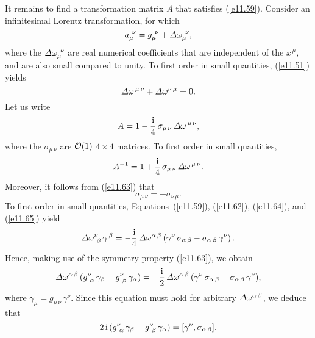 It remains to find a transformation matrix $A$ that satisfies (\ref{e11.59}). Consider an infinitesimal Lorentz transformation, for which
\begin{equation}\label{e11.62}
a_\mu^{~\nu} = g_\mu^{~\nu} + {\mit\Delta}\omega_\mu^{~\nu},
\end{equation}
where the ${\mit\Delta}\omega_\mu^{~\nu}$ are real numerical coefficients that are independent of the $x^{\,\mu}$, and are  also small compared to unity. To first order in small quantities, (\ref{e11.51}) yields
\begin{equation}\label{e11.63}
{\mit\Delta}\omega^{\,\mu\,\nu} + {\mit\Delta}\omega^{\nu\,\mu} = 0.
\end{equation}
Let us write
\begin{equation}\label{e11.64}
A = 1 - \frac{{\rm i}}{4}\,\sigma_{\mu\,\nu}\,{\mit\Delta}\omega^{\,\mu\,\nu},
\end{equation}
where the $\sigma_{\mu\,\nu}$ are ${\cal O}(1)$ $4\times 4$ matrices. To first order in small
quantities,
\begin{equation}\label{e11.65}
A^{-1} = 1 + \frac{{\rm i}}{4}\,\sigma_{\mu\,\nu}\,{\mit\Delta}\omega^{\,\mu\,\nu}.
\end{equation}
Moreover, it follows from (\ref{e11.63}) that
\begin{equation}
\sigma_{\mu\,\nu} = -\sigma_{\nu\,\mu}.
\end{equation}
To first order in small quantities, Equations~(\ref{e11.59}), (\ref{e11.62}), (\ref{e11.64}), and (\ref{e11.65}) yield
\begin{equation}
{\mit\Delta}\omega^\nu_{~\beta}\,\gamma^{\,\beta} = -\frac{\rm i}{4}\,{\mit\Delta}\omega^{\alpha\,\beta}\left(\gamma^\nu\,\sigma_{\alpha\,\beta}- \sigma_{\alpha\,\beta}\,\gamma^\nu\right).
\end{equation}
Hence, making use of the symmetry property (\ref{e11.63}), we obtain
\begin{equation}
{\mit\Delta}\omega^{\alpha\,\beta}\,(g^\nu_{~\alpha}\,\gamma_\beta -g^\nu_{~\beta}\,\gamma_\alpha) = -\frac{\rm i}{2}\,{\mit\Delta}\omega^{\alpha\,\beta}\,(\gamma^\nu\,\sigma_{\alpha\,\beta}-\sigma_{\alpha\,\beta}\,\gamma^\nu),
\end{equation}
where $\gamma_\mu = g_{\mu\,\nu}\,\gamma^\nu$. 
Since this equation must hold for arbitrary ${\mit\Delta}\omega^{\alpha\,\beta}$, we deduce that
\begin{equation}\label{e11.69}
2\,{\rm i}\,(g^\nu_{~\alpha}\,\gamma_\beta -g^\nu_{~\beta}\,\gamma_\alpha) = [\gamma^\nu, \sigma_{\alpha\,\beta}].
\end{equation}
